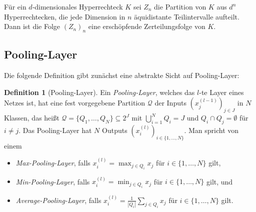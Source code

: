 \documentclass[paper=a4, 	%
		fontsize=11pt,
		abstract=true, 	%
		headsepline, 	%
		notitlepage	%
		]{scrartcl}
\theoremstyle{definition}
\newtheorem{definition}[theorem]{Definition}
\newcommand{\abs}[1]{\left\lvert#1\right\rvert}
\begin{document}
Für ein $d$-dimensionales Hyperrechteck $K$ sei $Z_n$ die Partition von $K$ aus $d^n$ Hyperrechtecken, die jede Dimension in $n$ äquidistante Teilintervalle aufteilt.
Dann ist die Folge $(Z_n)_n$ eine erschöpfende Zerteilungsfolge von $K$. 


\subsection{Pooling-Layer}

Die folgende Definition gibt zunächst eine abstrakte Sicht auf Pooling-Layer:

\begin{definition}[Pooling-Layer]
    Ein \emph{Pooling-Layer}, welches das $l$-te Layer eines Netzes ist, hat eine fest vorgegebene Partition $\mathcal{Q}$ der Inputs $(x^{(l-1)}_j)_{j \in J}$ in $N$ Klassen, das heißt $\mathcal{Q}=\{ Q_1,\dots,Q_N \}\subseteq 2^J$ mit $\bigcup_{i=1}^N Q_i = J$ und $Q_i\cap Q_j = \emptyset$ für $i\neq j$.
    Das Pooling-Layer hat $N$ Outputs $(x^{(l)}_i)_{i\in\{1,\dots, N\}}$. Man spricht von einem 
    \begin{itemize}
    \item \emph{Max-Pooling-Layer}, falls $x^{(l)}_i = \max_{ j\in Q_i } x_j$ für $i\in\{1,\dots,N\}$ gilt,
    \item \emph{Min-Pooling-Layer}, falls $x^{(l)}_i = \min_{ j\in Q_i } x_j$ für $i\in\{1,\dots,N\}$ gilt, und
    \item \emph{Average-Pooling-Layer}, falls $x^{(l)}_i = \frac{1}{\abs{Q_i}} \sum_{j\in Q_i} x_j$ für $i\in\{1,\dots,N\}$ gilt.
    \end{itemize}

\end{definition}


\begin{figure}
    \centering
    \begin{minipage}{.45\textwidth}
      \centering
      
      \label{fig:abstract-pooling-layer}
    \end{minipage}%
    \begin{minipage}{.55\textwidth}
        \centering
        
        \label{fig:pooling-mnist}
    \end{minipage}
\end{figure}
\end{document}
